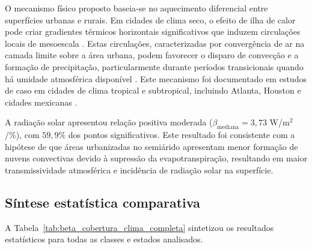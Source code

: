 O mecanismo físico proposto baseia-se no aquecimento diferencial entre superfícies urbanas e rurais. Em cidades de clima seco, o efeito de ilha de calor pode criar gradientes térmicos horizontais significativos que induzem circulações locais de mesoescala \citep{shepherd2005review}. Estas circulações, caracterizadas por convergência de ar na camada limite sobre a área urbana, podem favorecer o disparo de convecção e a formação de precipitação, particularmente durante períodos transicionais quando há umidade atmosférica disponível \citep{niyogi2017urbanization}. Este mecanismo foi documentado em estudos de caso em cidades de clima tropical e subtropical, incluindo Atlanta, Houston e cidades mexicanas \citep{shepherd2002atlanta, jauregui1996urban}.

A radiação solar apresentou relação positiva moderada ($\beta_{\text{mediana}} = 3{,}73$ W/m$^2$/\%), com $59{,}9\%$ dos pontos significativos. Este resultado foi consistente com a hipótese de que áreas urbanizadas no semiárido apresentam menor formação de nuvens convectivas devido à supressão da evapotranspiração, resultando em maior transmissividade atmosférica e incidência de radiação solar na superfície.

\subsection{Síntese estatística comparativa}

A Tabela~\ref{tab:beta_cobertura_clima_completa} sintetizou os resultados estatísticos para todas as classes e estados analisados.

